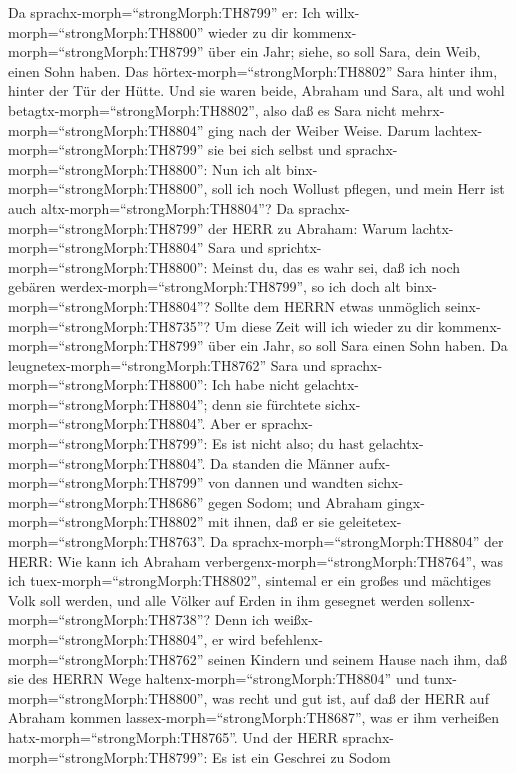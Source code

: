  Da sprachx-morph=``strongMorph:TH8799'' er: Ich
willx-morph=``strongMorph:TH8800'' wieder zu dir
kommenx-morph=``strongMorph:TH8799'' über ein Jahr; siehe, so soll Sara,
dein Weib, einen Sohn haben. Das hörtex-morph=``strongMorph:TH8802''
Sara hinter ihm, hinter der Tür der Hütte.  Und sie waren
beide, Abraham und Sara, alt und wohl
betagtx-morph=``strongMorph:TH8802'', also daß es Sara nicht
mehrx-morph=``strongMorph:TH8804'' ging nach der Weiber Weise.
 Darum lachtex-morph=``strongMorph:TH8799'' sie bei sich
selbst und sprachx-morph=``strongMorph:TH8800'': Nun ich alt
binx-morph=``strongMorph:TH8800'', soll ich noch Wollust pflegen, und
mein Herr ist auch altx-morph=``strongMorph:TH8804''?  Da
sprachx-morph=``strongMorph:TH8799'' der HERR zu Abraham: Warum
lachtx-morph=``strongMorph:TH8804'' Sara und
sprichtx-morph=``strongMorph:TH8800'': Meinst du, das es wahr sei, daß
ich noch gebären werdex-morph=``strongMorph:TH8799'', so ich doch alt
binx-morph=``strongMorph:TH8804''?  Sollte dem HERRN etwas
unmöglich seinx-morph=``strongMorph:TH8735''? Um diese Zeit will ich
wieder zu dir kommenx-morph=``strongMorph:TH8799'' über ein Jahr, so
soll Sara einen Sohn haben.  Da
leugnetex-morph=``strongMorph:TH8762'' Sara und
sprachx-morph=``strongMorph:TH8800'': Ich habe nicht
gelachtx-morph=``strongMorph:TH8804''; denn sie fürchtete
sichx-morph=``strongMorph:TH8804''. Aber er
sprachx-morph=``strongMorph:TH8799'': Es ist nicht also; du hast
gelachtx-morph=``strongMorph:TH8804''.  Da standen die
Männer aufx-morph=``strongMorph:TH8799'' von dannen und wandten
sichx-morph=``strongMorph:TH8686'' gegen Sodom; und Abraham
gingx-morph=``strongMorph:TH8802'' mit ihnen, daß er sie
geleitetex-morph=``strongMorph:TH8763''.  Da
sprachx-morph=``strongMorph:TH8804'' der HERR: Wie kann ich Abraham
verbergenx-morph=``strongMorph:TH8764'', was ich
tuex-morph=``strongMorph:TH8802'',  sintemal er ein großes
und mächtiges Volk soll werden, und alle Völker auf Erden in ihm
gesegnet werden sollenx-morph=``strongMorph:TH8738''?  Denn
ich weißx-morph=``strongMorph:TH8804'', er wird
befehlenx-morph=``strongMorph:TH8762'' seinen Kindern und seinem Hause
nach ihm, daß sie des HERRN Wege haltenx-morph=``strongMorph:TH8804''
und tunx-morph=``strongMorph:TH8800'', was recht und gut ist, auf daß
der HERR auf Abraham kommen lassex-morph=``strongMorph:TH8687'', was er
ihm verheißen hatx-morph=``strongMorph:TH8765''.  Und der
HERR sprachx-morph=``strongMorph:TH8799'': Es ist ein Geschrei zu Sodom
